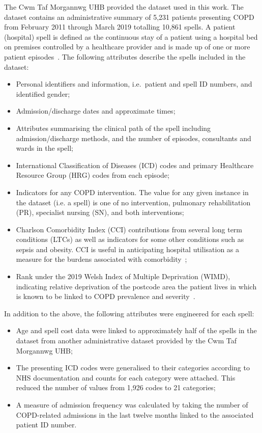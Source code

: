The Cwm Taf Morgannwg UHB provided the dataset used in this work. The
dataset contains an administrative summary of 5,231 patients presenting COPD
from February 2011 through March 2019 totalling 10,861 spells. A patient
(hospital) spell is defined as the continuous stay of a patient using a hospital
bed on premises controlled by a healthcare provider and is made up of one or
more patient episodes~\cite{NHS2020}. The following attributes describe the
spells included in the dataset:
\begin{itemize}
    \item Personal identifiers and information, i.e.\ patient and spell ID
        numbers, and identified gender;
    \item Admission/discharge dates and approximate times;
    \item Attributes summarising the clinical path of the spell including
        admission/discharge methods, and the number of episodes, consultants and
        wards in the spell;
    \item International Classification of Diseases (ICD) codes and primary
        Healthcare Resource Group (HRG) codes from each episode;
    \item Indicators for any COPD intervention. The value for any given instance
        in the dataset (i.e. a spell) is one of no intervention, pulmonary
        rehabilitation (PR), specialist nursing (SN), and both interventions;
    \item Charlson Comorbidity Index (CCI) contributions from several long term
        conditions (LTCs) as well as indicators for some other conditions such
        as sepsis and obesity. CCI is useful in anticipating hospital
        utilisation as a measure for the burdens associated with
        comorbidity~\cite{Simon2011};
    \item Rank under the 2019 Welsh Index of Multiple Deprivation (WIMD),
        indicating relative deprivation of the postcode area the patient lives
        in which is known to be linked to COPD prevalence and
        severity~\cite{Collins2018,Sexton2016,Steiner2017}.
\end{itemize}

In addition to the above, the following attributes were engineered for each
spell:
\begin{itemize}
    \item Age and spell cost data were linked to approximately half of the
        spells in the dataset from another administrative dataset provided by
        the Cwm Taf Morgannwg UHB;
    \item The presenting ICD codes were generalised to their categories
        according to NHS documentation and counts for each category were
        attached. This reduced the number of values from
        1,926 codes to 21 categories;
    \item A measure of admission frequency was calculated by taking the number
        of COPD-related admissions in the last twelve months linked to the
        associated patient ID number.
\end{itemize}

